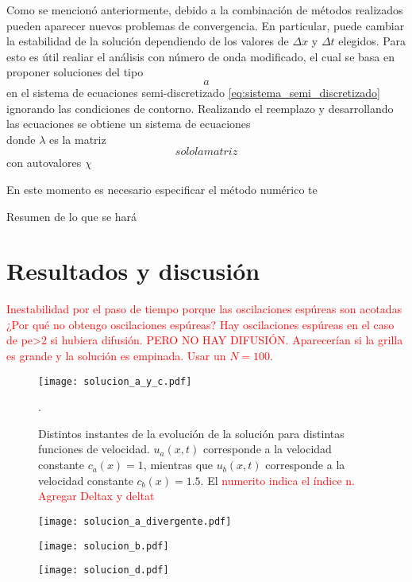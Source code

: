 \documentclass[aps,prb,twocolumn,superscriptaddress,floatfix,longbibliography,10pt]{revtex4-2}
\newcounter{para}
\begin{document}
Como se mencionó anteriormente, debido a la combinación de métodos realizados pueden aparecer nuevos problemas de convergencia. En particular, puede cambiar la estabilidad de la solución dependiendo de los valores de $\Delta x$ y $\Delta t$ elegidos. Para esto es útil realiar el análisis con número de onda modificado, el cual se basa en proponer soluciones del tipo
\[a \]
en el sistema de ecuaciones semi-discretizado \ref{eq:sistema_semi_discretizado} ignorando las condiciones de contorno. Realizando el reemplazo y desarrollando las ecuaciones se obtiene un sistema de ecuaciones
\[ \]
donde $\lambda$ es la matriz
\[solo la matriz\]
con autovalores $\chi$

En este momento es necesario especificar el método numérico te

Resumen de lo que se hará


\section{Resultados y discusión}

\textcolor{red}{Inestabilidad por el paso de tiempo porque las oscilaciones espúreas son acotadas ¿Por qué no obtengo oscilaciones espúreas? Hay oscilaciones espúreas en el caso de pe>2 si hubiera difusión. PERO NO HAY DIFUSIÓN. Aparecerían si la grilla es grande y la solución es empinada. Usar un $N = 100$.}

\begin{figure}[h]
  \texttt{[image: solucion\_a\_y\_c.pdf]}
  \caption{Distintos instantes de la evolución de la solución para distintas funciones de velocidad. $u_a(x,t)$ corresponde a la velocidad constante $c_a(x) = 1$, mientras que $u_b(x,t)$ corresponde a la velocidad constante $c_b(x) = 1.5$. El \textcolor{red}{numerito indica el índice n. Agregar Deltax y deltat}}. 
   \label{fig:solucion_a_y_c}
\end{figure}

\begin{figure}[h]
  \texttt{[image: solucion\_a\_divergente.pdf]}
  \caption{}
   \label{fig:solucion_a_divergente}
\end{figure}

\begin{figure}[h]
  \texttt{[image: solucion\_b.pdf]}
  \caption{}
   \label{fig:solucion_b}
\end{figure}

\begin{figure}[h]
  \texttt{[image: solucion\_d.pdf]}
  \caption{}
   \label{fig:solucion_d}
\end{figure}
\end{document}
